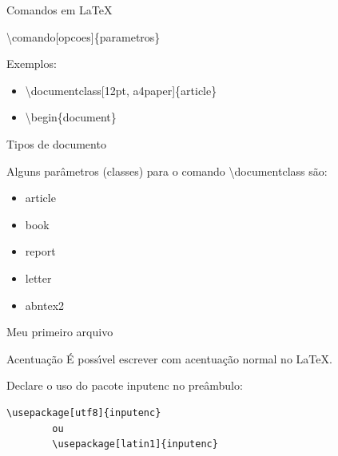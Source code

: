 \documentclass{beamer}
\newcommand{\tbs}{\textbackslash}
\begin{document}
\begin{frame}{Comandos em \LaTeX}
    \begin{centering}
        \textbackslash comando[opcoes]\{parametros\}
    \end{centering}

    \vspace{1cm}
    Exemplos:
    \begin{itemize}
        \item \textbackslash documentclass[12pt, a4paper]\{article\}
        \item \tbs begin\{document\}
    \end{itemize}
\end{frame}

\begin{frame}{Tipos de documento}

    Alguns par\^ametros (classes) para o comando \tbs documentclass s\~ao:
    \begin{itemize}
        \item article
        \item book
        \item report
        \item letter
        \item abntex2
    \end{itemize}
\end{frame}


\begin{frame}{Meu primeiro arquivo}
    
\end{frame}

\begin{frame}[fragile]{Acentua\c{c}\~ao}
    \'E poss\'{\i}vel escrever com acentua\c{c}\~ao normal no \LaTeX.

    \vspace{1cm}
    Declare o uso do pacote inputenc no pre\^ambulo:
    \begin{lstlisting}[style=limpo]
        \usepackage[utf8]{inputenc}
        ou
        \usepackage[latin1]{inputenc}
    \end{lstlisting}
\end{frame}
\end{document}
